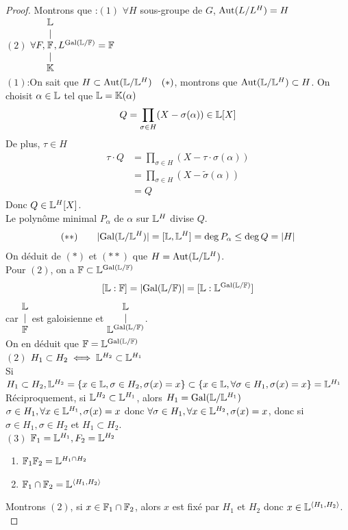 \documentclass[]{report}
\begin{document}
    \begin{proof}
        Montrons que :$(1)$ $\forall H$ sous-groupe de $G$, $\text{Aut}(L/L^H)=H$\\
        $(2)$ $\forall F,\begin{matrix} \mathbb{L}\\ |\\ \begin{matrix} \mathbb{F}\\ |\\ \mathbb{K} \end{matrix} \end{matrix},L^{\text{Gal}(\mathbb{L}/\mathbb{F})}=\mathbb{F}$\\
        $(1)$:On sait que $H\subset \text{Aut}(\mathbb{L}/\mathbb{L}^H)\quad (*)$, montrons que $\text{Aut}(\mathbb{L}/\mathbb{L}^H)\subset H$. On choisit $\alpha\in \mathbb{L}$ tel que $\mathbb{L}=\mathbb{K}(\alpha)$
        \[Q=\prod_{\sigma\in H}(X-\sigma(\alpha))\in \mathbb{L}[X]\]
        De plus, $\tau\in H$
        \begin{align*}
            \tau\cdot Q&=\prod_{\sigma\in H}(X-\tau \cdot \sigma(\alpha))\\
            &=\prod_{\sigma\in H}(X-\tilde{\sigma}(\alpha))\\
            &= Q
        \end{align*}
        Donc $Q\in \mathbb{L}^H[X]$.\\
        Le polynôme minimal $P_\alpha$ de $\alpha$ sur $\mathbb{L}^H$ divise $Q$.
        \[(**)\qquad|\text{Gal}(\mathbb{L}/\mathbb{L}^H)|=[\mathbb{L},\mathbb{L}^H]=\deg P_\alpha\le \deg Q=|H|\]
        On déduit de $(*)$ et $(**)$ que $H=\text{Aut}(\mathbb{L}/\mathbb{L}^H)$.\\
        Pour $(2)$, on a $\mathbb{F}\subset \mathbb{L}^{\text{Gal}(\mathbb{L}/\mathbb{F})}$
        \[[\mathbb{L}:\mathbb{F}]=|\text{Gal}(\mathbb{L}/\mathbb{F})|=[\mathbb{L}:\mathbb{L}^{\text{Gal}(\mathbb{L}/\mathbb{F})}]\]
        car $\begin{matrix} \mathbb{L}\\ |\\ \mathbb{F} \end{matrix}$ est galoisienne et $\begin{matrix} \mathbb{L}\\ |\\ \mathbb{L}^{\text{Gal}(\mathbb{L}/\mathbb{F})} \end{matrix}$.\\
        On en déduit que $\mathbb{F}=\mathbb{L}^{\text{Gal}(\mathbb{L}/\mathbb{F})}$\\
        $(2)$ $H_1\subset H_2\iff \mathbb{L}^{H_2}\subset \mathbb{L}^{H_1}$\\
        Si $H_1\subset H_2,\mathbb{L}^{H_2}=\{x\in \mathbb{L},\sigma\in H_2,\sigma(x)=x\}\subset \{x\in \mathbb{L},\forall \sigma \in H_1,\sigma(x)=x\}=\mathbb{L}^{H_1}$\\
        Réciproquement, si $\mathbb{L}^{H_2}\subset \mathbb{L}^{H_1}$, alors $H_1=\text{Gal}(\mathbb{L}/\mathbb{L}^{H_1})$\\
        $\sigma\in H_1, \forall x\in \mathbb{L}^{H_1}, \sigma(x)=x$ donc $\forall \sigma\in H_1, \forall x\in \mathbb{L}^{H_2}, \sigma(x)=x$, donc si $\sigma\in H_1,\sigma\in H_2$ et $H_1\subset H_2$.\\
        $(3)$ $\mathbb{F}_1=\mathbb{L}^{H_1}, F_2=\mathbb{L}^{H_2}$
        \begin{enumerate}
            \item $\mathbb{F}_1\mathbb{F}_2=\mathbb{L}^{H_1\cap H_2}$
            \item $\mathbb{F}_1\cap \mathbb{F}_2=\mathbb{L}^{\langle H_1,H_2 \rangle}$
        \end{enumerate}
        Montrons $(2)$, si $x\in \mathbb{F}_1\cap \mathbb{F}_2$, alors $x$ est fixé par $H_1$ et $H_2$ donc $x\in \mathbb{L}^{\langle H_1,H_2 \rangle}$.\\

\end{proof}
\end{document}
